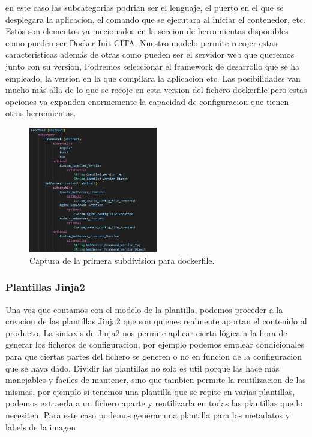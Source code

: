 \documentclass[12pt, a4paper, twoside]{article}
\begin{document}
en este caso las subcategorias podrian ser el lenguaje, el puerto en el que se desplegara la aplicacion, el comando que se ejecutara al iniciar el contenedor, etc.
Estos son elementos ya mecionados en la seccion de herramientas disponibles como pueden ser Docker Init CITA, Nuestro modelo permite recojer estas caracteristicas además de otras 
como pueden ser el servidor web que queremos junto con su version, Podremos seleccionar el framework de desarrollo que se ha empleado, la version en la que compilara la aplicacion etc.
Las posibilidades van mucho más alla de lo que se recoje en esta version del fichero dockerfile pero estas opciones ya expanden enormemente la capacidad de configuracion que tienen otras 
herremientas. 
  
\begin{figure}[ht]
	\centering
	  \includegraphics[width=0.5\textwidth]{dockerfile.frontend.png}
	\caption{Captura de la primera subdivision para dockerfile.}
\end{figure}

\subsubsection{Plantillas Jinja2}
Una vez que contamos con el modelo de la plantilla, podemos proceder a la creacion de las plantillas Jinja2 que son quienes realmente aportan el contenido al producto.
La sintaxis de Jinja2 nos permite aplicar cierta lógica a la hora de generar los ficheros de configuracion, por ejemplo podemos emplear condicionales para que ciertas partes del fichero se generen o no en funcion de la configuracion que se haya dado.
Dividir las plantillas no solo es util porque las hace más manejables y faciles de mantener, sino que tambien permite la reutilizacion de las mismas, por ejemplo si tenemos una plantilla que se repite en varias plantillas, podemos extraerla a un fichero aparte y reutilizarla en todas las plantillas que lo necesiten.
Para este caso podemos generar una plantilla para los metadatos y labels de la imagen 
\end{document}
